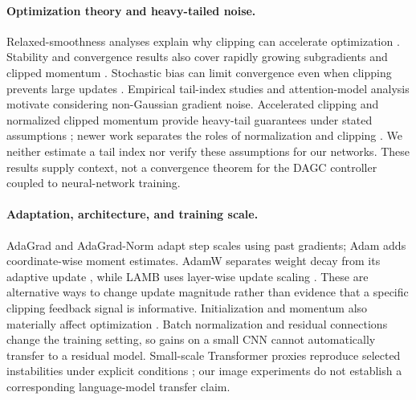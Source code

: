 \documentclass{article}
\begin{document}
\paragraph{Optimization theory and heavy-tailed noise.}
Relaxed-smoothness analyses explain why clipping can accelerate optimization
\citep{zhang2020why,bohang2020improved}. Stability and convergence results
also cover rapidly growing subgradients and clipped momentum
\citep{mai2021stability}. Stochastic bias can limit convergence even when
clipping prevents large updates \citep{koloskova2023revisiting}.
Empirical tail-index studies \citep{simsekli2019tail} and attention-model
analysis \citep{zhang2020gradient} motivate considering non-Gaussian gradient
noise. Accelerated clipping and normalized clipped momentum provide
heavy-tail guarantees under stated assumptions
\citep{gorbunov2020heavy,cutkosky2021tails}; newer work separates the roles
of normalization and clipping \citep{sun2025revisiting}. We neither estimate
a tail index nor verify these assumptions for our networks. These results
supply context, not a convergence theorem for the DAGC controller coupled
to neural-network training.

\paragraph{Adaptation, architecture, and training scale.}
AdaGrad \citep{duchi2011adaptive} and AdaGrad-Norm
\citep{ward2019adagrad} adapt step scales using past gradients; Adam
\citep{kingma2015adam} adds coordinate-wise moment estimates. AdamW
separates weight decay from its adaptive update \citep{loshchilov2019adamw},
while LAMB uses layer-wise update scaling \citep{you2020lamb}. These are
alternative ways to change update magnitude rather than evidence that a
specific clipping feedback signal is informative. Initialization and momentum
also materially affect optimization \citep{glorot2010understanding,sutskever2013importance}.
Batch normalization \citep{ioffe2015batch,santurkar2018batch} and residual
connections \citep{he2016deep} change the training setting, so gains on a
small CNN cannot automatically transfer to a residual model. Small-scale
Transformer proxies reproduce selected instabilities under explicit
conditions \citep{wortsman2024smallscale}; our image experiments do not
establish a corresponding language-model transfer claim.
\end{document}
